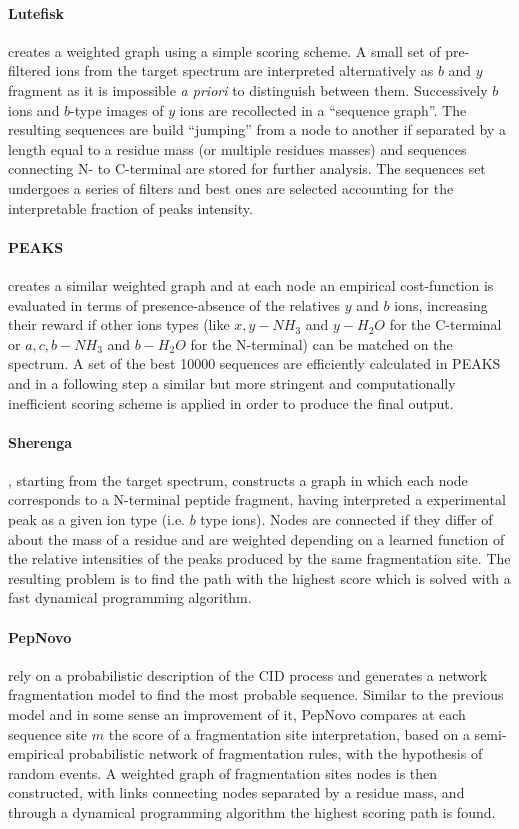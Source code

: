 \paragraph{Lutefisk}
\cite{lutefisk1997,lutefisk2001} creates a weighted graph using  a simple
scoring scheme. 
A small set of pre-filtered ions from the target spectrum are
interpreted alternatively as $b$ and $y$ fragment as it is impossible \emph{a
priori} to distinguish between them. Successively $b$ ions and $b$-type images of
$y$ ions are recollected in a ``sequence graph''.
The resulting sequences are build ``jumping'' from a node to another if
separated by a length equal to a residue mass (or multiple residues masses) and
sequences connecting N- to C-terminal are stored for further analysis.
The sequences set undergoes a series of filters and best ones are selected
accounting for the interpretable fraction of peaks intensity.

\paragraph{PEAKS}
\cite{peaks2003} creates a similar weighted graph and at each node an empirical
cost-function is evaluated in terms of presence-absence of the relatives $y$ and
$b$ ions, increasing their reward if other ions types (like $x,y-NH_3$ and
$y-H_2O$ for the C-terminal or $a,c,b-NH_3$ and $b-H_2O$ for the N-terminal)
can be matched on the spectrum.
A set of the best 10000 sequences are efficiently calculated in PEAKS and in a
following step a similar but more stringent and computationally inefficient
scoring scheme is applied in order
to produce the final output.

\paragraph{Sherenga}
\cite{dancik1999}, starting from the target spectrum, constructs a graph in which
each node corresponds to a N-terminal peptide fragment, having interpreted a
experimental peak as a given ion type (i.e. $b$ type ions).
Nodes are connected if they differ of about the mass of a residue and are
weighted depending on a learned function of the relative intensities
of the peaks produced by the same fragmentation site.
The resulting problem is to find the path with the highest score which is
solved with a fast dynamical programming algorithm.
 
\paragraph{PepNovo}
\cite{pepnovo-analchem-2005} rely on a probabilistic description of the CID
process and generates a network fragmentation model to find the most probable
sequence. 
Similar to the previous model and in some sense an improvement of it, PepNovo
compares at each sequence site $m$ the score of a fragmentation site interpretation,
based on a semi-empirical probabilistic network of fragmentation rules, with
the hypothesis of random events.
A weighted graph of fragmentation sites nodes is then constructed, with links connecting nodes
separated by a residue mass, and through a dynamical programming algorithm the
highest scoring path is found.

